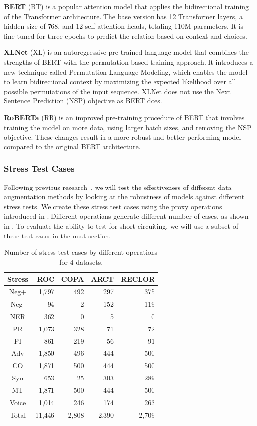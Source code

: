 \textbf{BERT} (BT) is a popular attention model that applies the bidirectional training of the Transformer architecture. The base version has 12 Transformer layers, a hidden size of 768, and 12 self-attention heads, totaling 110M parameters. It is fine-tuned for three epochs to predict the relation based on context and choices.

\textbf{XLNet} (XL) is an autoregressive pre-trained language model that combines the strengths of BERT with the permutation-based training approach. It introduces a new technique called Permutation Language Modeling, which enables the model to learn bidirectional context by maximizing the expected likelihood over all possible permutations of the input sequence. XLNet does not use the Next Sentence Prediction (NSP) objective as BERT does.

\textbf{RoBERTa} (RB) is an improved pre-training procedure of BERT that involves training the model on more data, using larger batch sizes, and removing the NSP objective. These changes result in a more robust and better-performing model compared to the original BERT architecture.

\subsubsection{Stress Test Cases}

Following previous research~\cite{checklist2020acl}, 
we will test the effectiveness of different data augmentation
methods by looking at the robustness of models against
different stress tests.
We create these stress test cases using the proxy operations
introduced in .
Different operations generate different number of cases,
as shown in . To evaluate the
ability to test for short-circuiting, we will
use a subset of these test cases in the next section. 



\begin{table}[th]
\centering
\scriptsize
\begin{tabular}{c|rrrr}
\toprule
\textbf{Stress} & \textbf{ROC} & \textbf{COPA} & \textbf{ARCT} & \textbf{RECLOR} \\ \midrule
Neg+  &	1,797&492&	297&375	\\ \hline
Neg-  &	94&	2&	152&	119\\ \hline
NER  &	362&	0&	5&0	\\ \hline
PR  &	1,073&	328&71&72	\\ \hline
PI  &	     861&	219&	56&	91\\ \midrule
Adv  &	1,850&496	&444	&500	\\ \hline
CO  &	1,871&500	&444	&500	\\ \hline
Syn&	653&	 25&	303&289	\\ \midrule
MT  &	1,871&500	&444	&500	\\ \hline
Voice  &	1,014&246	&174	&263	\\ \hline
Total & 11,446  &  2,808 & 2,390 & 2,709 \\ \bottomrule
\end{tabular}
\caption{Number of stress test cases by different operations for 4 datasets.}
\label{tab:cases}
\end{table}
